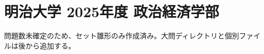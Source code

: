 \documentclass[../../uem_mei_q.tex]{subfiles}
\begin{document}
    \section{明治大学 2025年度 政治経済学部}

    問題数未確定のため、セット雛形のみ作成済み。大問ディレクトリと個別ファイルは後から追加する。
\end{document}
